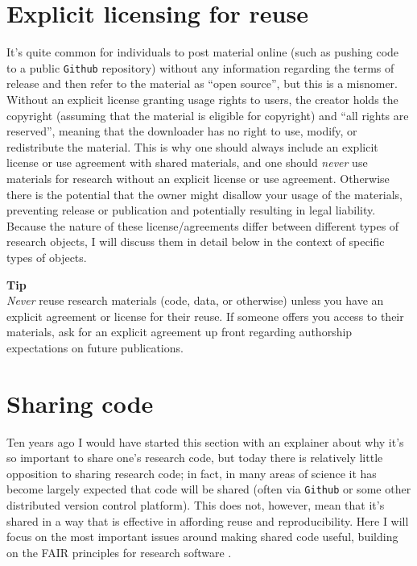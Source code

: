\section{Explicit licensing for reuse}

It's quite common for individuals to post material online (such as pushing code to a public \texttt{Github} repository) without any information regarding the terms of release and then refer to the material as ``open source'', but this is a misnomer.  Without an explicit license granting usage rights to users, the creator holds the copyright (assuming that the material is eligible for copyright) and ``all rights are reserved'', meaning that the downloader has no right to use, modify, or redistribute the material. This is why one should always include an explicit license or use agreement with shared materials, and one should \textit{never} use materials for research without an explicit license or use agreement. Otherwise there is the potential that the owner might disallow your usage of the materials, preventing release or publication and potentially resulting in legal liability.  Because the nature of these license/agreements differ between different types of research objects, I will discuss them in detail below in the context of specific types of objects.

\begin{framed}
\textbf{Tip}\\
\textit{Never} reuse research materials (code, data, or otherwise) unless you have an explicit agreement or license for their reuse.  If someone offers you access to their materials, ask for an explicit agreement up front regarding authorship expectations on future publications.
\end{framed}

\section{Sharing code}

Ten years ago I would have started this section with an explainer about why it's so important to share one's research code, but today there is relatively little opposition to sharing research code; in fact, in many areas of science it has become largely expected that code will be shared (often via \texttt{Github} or some other distributed version control platform).  This does not, however, mean that it's shared in a way that is effective in affording reuse and reproducibility. Here I will focus on the most important issues around making shared code useful, building on the FAIR principles for research software \citep{Barker:2022aa}.

